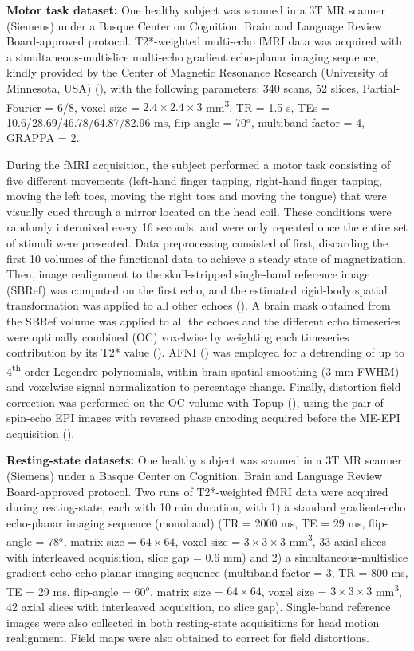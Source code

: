 \textbf{Motor task dataset:} One healthy subject was scanned in a 3T MR scanner (Siemens) under a Basque Center on Cognition, Brain and Language Review Board-approved protocol. T2*-weighted multi-echo fMRI data was acquired with a simultaneous-multislice multi-echo gradient echo-planar imaging sequence, kindly provided by the Center of Magnetic Resonance Research (University of Minnesota, USA) (\citealt{Feinberg_2010,Moeller_2010,Setsompop_2011}), with the following parameters: 340 scans, 52 slices, Partial-Fourier = 6/8, voxel size = $2.4\times2.4\times3$ mm\textsuperscript{3}, TR = 1.5 s, TEs = 10.6/28.69/46.78/64.87/82.96 ms, flip angle = 70\(^o\), multiband factor = 4, GRAPPA = 2.

During the fMRI acquisition, the subject performed a motor task consisting of five different movements (left-hand finger tapping, right-hand finger tapping, moving the left toes, moving the right toes and moving the tongue) that were visually cued through a mirror located on the head coil. These conditions were randomly intermixed every 16 seconds, and were only repeated once the entire set of stimuli were presented. Data preprocessing consisted of first, discarding the first 10 volumes of the functional data to achieve a steady state of magnetization. Then, image realignment to the skull-stripped single-band reference image (SBRef) was computed on the first echo, and the estimated rigid-body spatial transformation was applied to all other echoes (\citealt{Jenkinson2012FSL,Jenkinson_2001}). A brain mask obtained from the SBRef volume was applied to all the echoes and the different echo timeseries were optimally combined (OC) voxelwise by weighting each timeseries contribution by its T2* value (\citealt{Posse_1999}). AFNI (\citealt{Cox1996AFNISoftwareAnalysis}) was employed for a detrending of up to 4\textsuperscript{th}-order Legendre polynomials, within-brain spatial smoothing (3 mm FWHM) and voxelwise signal normalization to percentage change. Finally, distortion field correction was performed on the OC volume with Topup (\citealt{Andersson_2003}), using the pair of spin-echo EPI images with reversed phase encoding acquired before the ME-EPI acquisition (\citealt{Glasser_2016}).

\textbf{Resting-state datasets:} One healthy subject was scanned in a 3T MR scanner (Siemens) under a Basque Center on Cognition, Brain and Language Review Board-approved protocol. Two runs of T2*-weighted fMRI data were acquired during resting-state, each with 10 min duration, with 1) a standard gradient-echo echo-planar imaging sequence (monoband) (TR = 2000 ms, TE = 29 ms, flip-angle = 78\(^o\), matrix size = $64\times64$, voxel size = $3\times3\times3$ mm\textsuperscript{3}, 33 axial slices with interleaved acquisition, slice gap = 0.6 mm) and 2) a  simultaneous-multislice gradient-echo echo-planar imaging sequence (multiband factor = 3, TR = 800 ms, TE = 29 ms, flip-angle = 60\(^o\), matrix size = $64\times64$, voxel size = $3\times3\times3$ mm\textsuperscript{3}, 42 axial slices with interleaved acquisition, no slice gap). Single-band reference images were also collected in both resting-state acquisitions for head motion realignment. Field maps were also obtained to correct for field distortions.

